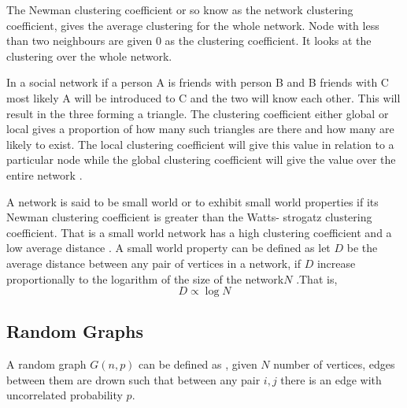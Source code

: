  The Newman clustering coefficient or so know as the network clustering coefficient, gives the average clustering for the whole network. Node with less than two neighbours are given 0 as the clustering coefficient. It looks at the clustering over the whole network.
 
 In a social network if a person A is friends with person B and B friends with C most likely A will be introduced to C and the two will know each other. This will result in the three forming a triangle. The clustering coefficient either global or local gives a proportion of how many such triangles are there and how many are likely to exist. The local  clustering coefficient will give this value in relation to a particular node while the global clustering coefficient will give the value over the entire network \citep{estrada2015first}.
 
A network is said to be small world or to exhibit small world properties if its Newman clustering coefficient is greater than the Watts- strogatz clustering coefficient. That is a small world network has a high clustering coefficient and a low average distance \citep{estrada2012structure}. A small world property can be defined as let $D$ be the average distance between any pair of vertices in a network, if $D$ increase proportionally to the logarithm of the size of the network$N$ \citep{newman1999scaling}.That is,
 \begin{equation}
 D \propto \log N
 \end{equation}
 
\subsection{Random Graphs} 
 A random graph $G(n,p)$ can be defined as , given  $N$ number of vertices, edges between them are drown such that between any pair $i,j$ there is an edge with uncorrelated probability $p$. 

